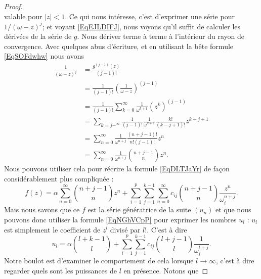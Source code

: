 \begin{proof}
\begin{equation}
    \end{equation}
    valable pour \( | z |<1\). Ce qui nous intéresse, c'est d'exprimer une série pour \( 1/(\omega-z)^j\); et voyant \eqref{EqEJLDIFJ}, nous voyons qu'il suffit de calculer les dérivées de la série de \( g\). Nous dériver terme à terme à l'intérieur du rayon de convergence. Avec quelques abus d'écriture, et en utilisant la bête formule \eqref{EqSOFdwhw} nous avons
    \begin{subequations}
        \begin{align}
            \frac{1}{ (\omega-z)^j }&=\frac{ g^{(j-1)}(z) }{ (j-1)! }\\
            &=\frac{1}{ (j-1)! }\left( \frac{1}{ \omega-z } \right)^{(j-1)}\\
            &=\frac{1}{ (j-1)! }\sum_{k=0}^{\infty}\frac{1}{ \omega^{k+1} }(z^k)^{(j-1)}\\
            &=\sum_{k=j-^{\infty}}\frac{1}{ (j-1)! }\frac{1}{ \omega^{k+1} }\frac{ k! }{ (k-j+1)! }z^{k-j+1}\\
            &=\sum_{n=0}^{\infty}\frac{1}{ \omega^{n+j} }\frac{ (n+j-1)! }{ n!(j-1)! }z^n\\
            &=\sum_{n=0}^{\infty}\frac{1}{ \omega^{n+j} }{n+j-1\choose n}z^n.
        \end{align}
    \end{subequations}
    Nous pouvons utiliser cela pour récrire la formule \eqref{EqDLTJaYr} de façon considérablement plus compliquée :
    \begin{equation}
            f(z)=\alpha\sum_{n=0}^{\infty}{n+j-1\choose n}z^n
            +\sum_{i=1}^p\sum_{j=1}^{k-1}\sum_{n=0}^{\infty}c_{ij}{n+j-1\choose n}\frac{ z^n }{ \omega_i^{n+j} }.
    \end{equation}
    Mais nous savons que ce \( f\) est la série génératrice de la suite \( (u_n)\) et que nous pouvons donc utiliser la formule \eqref{EqNGhVCpP} pour exprimer les nombres \( u_l\) : \( u_l\) est simplement le coefficient de \( z^l\) divisé par \( l!\). C'est à dire
    \begin{equation}
        u_l=\alpha{l+k-1\choose l}+\sum_{i=1}^p\sum_{j=1}^{k-1}c_{ij}{l+j-1\choose l}\frac{1}{ \omega_i^{l+j} }.
    \end{equation}
    Notre boulot est d'examiner le comportement de cela lorsque \( l\to\infty\), c'est à dire regarder quels sont les puissances de \( l\) en présence. Notons que 


\end{proof}
